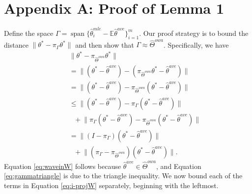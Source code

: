 \documentclass[twoside]{article}
\DeclareMathOperator*{\vecspan}{span}
\newcommand{\matW}{\hat W}
\newcommand{\W}{{\hat \Theta^{\textit{owa}}}}
\newcommand{\E}{\mathbb{E}}
\newcommand{\w}{\theta}
\newcommand{\wave}{\hat\w^{ave}}
\newcommand{\wmle}{\hat\w^{mle}}
\newcommand{\wstar}{{\w^{*}}}
\newcommand{\ltwo}[1]{{\lVert {#1} \rVert}}
\newcommand{\proj}[1]{\pi_{{#1}}}
\begin{document}


\clearpage




\clearpage

\section*{Appendix A: Proof of Lemma 1}

Define the space $\Gamma=\vecspan\{\wmle_i-\E\wave\}_{i=1}^m$.
Our proof strategy is to bound the distance $\ltwo{\wstar-\proj\Gamma\wstar}$ and then show that $\Gamma\approx\W$.
Specifically, we have
\begin{align}
~~~~~~&\!\!\!\!\!\!\!\!\!\!\!\!\!\!\!%
\ltwo{\wstar-\proj\W\wstar}
\nonumber
\\
&=
\ltwo{(\wstar-\wave) - (\proj\W\wstar - \wave)}
\\
&=
\ltwo{(\wstar-\wave) - \proj\W(\wstar - \wave)}
\label{eq:waveinW}
\\
&\le
\ltwo{(\wstar-\wave) - \proj\Gamma(\wstar-\wave)}
\nonumber
\\
&~~~+
\ltwo{\proj\Gamma(\wstar-\wave) - \proj\W(\wstar-\wave)}
\label{eq:gammatriangle}
\\
&=
\ltwo{(I-\proj\Gamma)(\wstar - \wave)}
\nonumber
\\
&~~~+
\ltwo{(\proj\Gamma-\proj\W)(\wstar - \wave)}
.
\label{eq:i-projW}
\end{align}
Equation \ref{eq:waveinW} follows because $\wave\in\W$,
and Equation \ref{eq:gammatriangle} is due to the triangle inequality.
We now bound each of the terms in Equation \ref{eq:i-projW} separately,
beginning with the leftmost.
\end{document}

